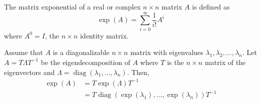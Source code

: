 \begin{defn}
The matrix exponential of a real or complex $n \times n$ matrix $A$ is defined as
$$
\exp(A) = \sum_{i = 0}^\infty \frac{1}{i!} A^i
$$
where $A^0 = I$, the $n \times n$ identity matrix.
\end{defn}

\begin{theorem} \label{thm:eigen_matrix_exp}
Assume that $A$ is a diagonalizable $n \times n$ matrix with eigenvalues $\lambda_1, \lambda_2, \ldots, \lambda_n$.
Let $A = T \Lambda T^{-1}$ be the eigendecomposition of $A$ where $T$ is the $n \times n$ matrix of the eigenvectors and $\Lambda = \operatorname{diag}(\lambda_1, \ldots, \lambda_n)$.
Then,
\begin{align*}
    \exp(A) &= T \exp(\Lambda) T^{-1}\\
    &= T \operatorname{diag}(\exp(\lambda_1), \ldots, \exp(\lambda_n)) T^{-1}
\end{align*}
\end{theorem}